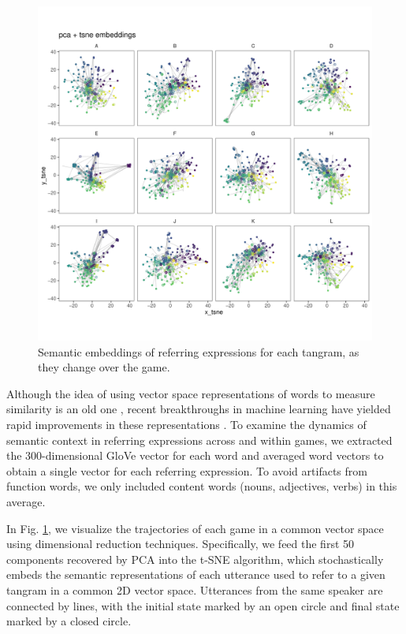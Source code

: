\documentclass[alpha-refs]{wiley-article}
\begin{document}
\begin{figure}[t]
\centering
\includegraphics[scale=.3]{tsne_embeddings.pdf}
\caption{Semantic embeddings of referring expressions for each tangram, as they change over the game. }
\label{fig:tsne}
\end{figure}

Although the idea of using vector space representations of words to measure similarity is an old one \cite{XXX}, recent breakthroughs in machine learning have yielded rapid improvements in these representations \cite{XXX}.
To examine the dynamics of semantic context in referring expressions across and within games, we extracted the 300-dimensional GloVe vector for each word \cite{} and averaged word vectors to obtain a single vector for each referring expression.
To avoid artifacts from function words, we only included content words (nouns, adjectives, verbs) in this average.

In Fig. \ref{fig:tsne}, we visualize the trajectories of each game in a common vector space using dimensional reduction techniques.
Specifically, we feed the first 50 components recovered by PCA into the t-SNE algorithm, which stochastically embeds the semantic representations of each utterance used to refer to a given tangram in a common 2D vector space. 
Utterances from the same speaker are connected by lines, with the initial state marked by an open circle and final state marked by a closed circle.
\end{document}
